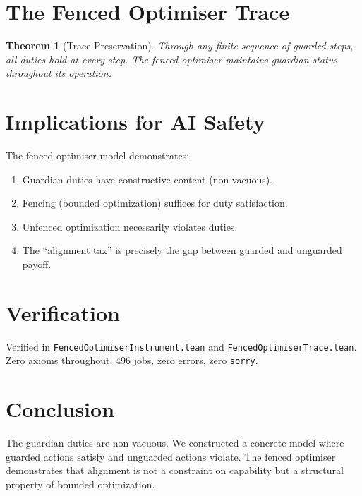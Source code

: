 \documentclass[12pt,a4paper]{article}
\newtheorem{theorem}{Theorem}[section]
\begin{document}
\section{The Fenced Optimiser Trace}

\begin{theorem}[Trace Preservation]\label{thm:trace}
Through any finite sequence of guarded steps, all duties hold at every step.
The fenced optimiser maintains guardian status throughout its operation.
\end{theorem}

\section{Implications for AI Safety}

The fenced optimiser model demonstrates:
\begin{enumerate}
    \item Guardian duties have constructive content (non-vacuous).
    \item Fencing (bounded optimization) suffices for duty satisfaction.
    \item Unfenced optimization necessarily violates duties.
    \item The ``alignment tax'' is precisely the gap between guarded and
    unguarded payoff.
\end{enumerate}

\section{Verification}

Verified in \texttt{FencedOptimiserInstrument.lean} and
\texttt{FencedOptimiserTrace.lean}. Zero axioms throughout.
496 jobs, zero errors, zero \texttt{sorry}.

\section{Conclusion}

The guardian duties are non-vacuous. We constructed a concrete model where
guarded actions satisfy and unguarded actions violate. The fenced optimiser
demonstrates that alignment is not a constraint on capability but a
structural property of bounded optimization.
\end{document}
